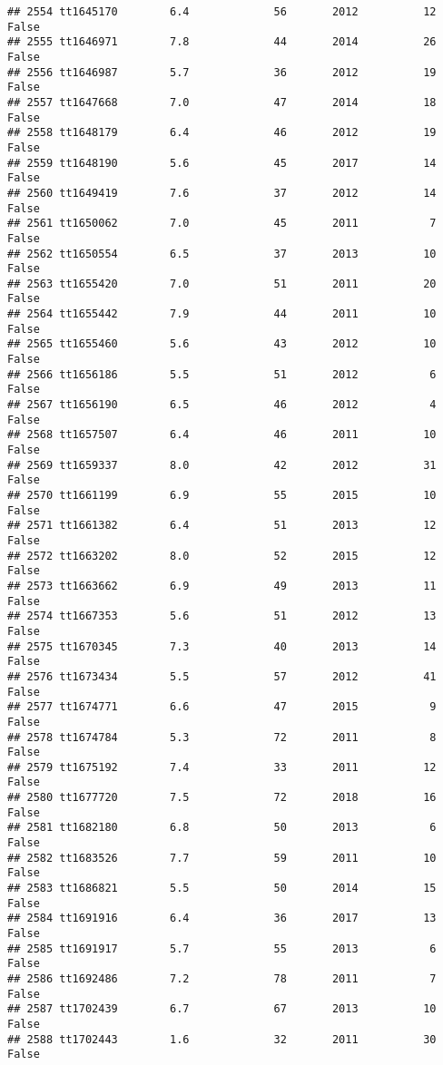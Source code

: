 \documentclass[
]{article}
\begin{document}
\begin{verbatim}
## 2554 tt1645170        6.4             56       2012          12   False
## 2555 tt1646971        7.8             44       2014          26   False
## 2556 tt1646987        5.7             36       2012          19   False
## 2557 tt1647668        7.0             47       2014          18   False
## 2558 tt1648179        6.4             46       2012          19   False
## 2559 tt1648190        5.6             45       2017          14   False
## 2560 tt1649419        7.6             37       2012          14   False
## 2561 tt1650062        7.0             45       2011           7   False
## 2562 tt1650554        6.5             37       2013          10   False
## 2563 tt1655420        7.0             51       2011          20   False
## 2564 tt1655442        7.9             44       2011          10   False
## 2565 tt1655460        5.6             43       2012          10   False
## 2566 tt1656186        5.5             51       2012           6   False
## 2567 tt1656190        6.5             46       2012           4   False
## 2568 tt1657507        6.4             46       2011          10   False
## 2569 tt1659337        8.0             42       2012          31   False
## 2570 tt1661199        6.9             55       2015          10   False
## 2571 tt1661382        6.4             51       2013          12   False
## 2572 tt1663202        8.0             52       2015          12   False
## 2573 tt1663662        6.9             49       2013          11   False
## 2574 tt1667353        5.6             51       2012          13   False
## 2575 tt1670345        7.3             40       2013          14   False
## 2576 tt1673434        5.5             57       2012          41   False
## 2577 tt1674771        6.6             47       2015           9   False
## 2578 tt1674784        5.3             72       2011           8   False
## 2579 tt1675192        7.4             33       2011          12   False
## 2580 tt1677720        7.5             72       2018          16   False
## 2581 tt1682180        6.8             50       2013           6   False
## 2582 tt1683526        7.7             59       2011          10   False
## 2583 tt1686821        5.5             50       2014          15   False
## 2584 tt1691916        6.4             36       2017          13   False
## 2585 tt1691917        5.7             55       2013           6   False
## 2586 tt1692486        7.2             78       2011           7   False
## 2587 tt1702439        6.7             67       2013          10   False
## 2588 tt1702443        1.6             32       2011          30   False

\end{verbatim}
\end{document}
